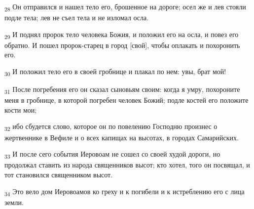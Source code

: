 \begin{tcolorbox}
\textsubscript{28} Он отправился и нашел тело его, брошенное на дороге; осел же и лев стояли подле тела; лев не съел тела и не изломал осла.
\end{tcolorbox}
\begin{tcolorbox}
\textsubscript{29} И поднял пророк тело человека Божия, и положил его на осла, и повез его обратно. И пошел пророк-старец в город [свой], чтобы оплакать и похоронить его.
\end{tcolorbox}
\begin{tcolorbox}
\textsubscript{30} И положил тело его в своей гробнице и плакал по нем: увы, брат мой!
\end{tcolorbox}
\begin{tcolorbox}
\textsubscript{31} После погребения его он сказал сыновьям своим: когда я умру, похороните меня в гробнице, в которой погребен человек Божий; подле костей его положите кости мои;
\end{tcolorbox}
\begin{tcolorbox}
\textsubscript{32} ибо сбудется слово, которое он по повелению Господню произнес о жертвеннике в Вефиле и о всех капищах на высотах, в городах Самарийских.
\end{tcolorbox}
\begin{tcolorbox}
\textsubscript{33} И после сего события Иеровоам не сошел со своей худой дороги, но продолжал ставить из народа священников высот; кто хотел, того он посвящал, и тот становился священником высот.
\end{tcolorbox}
\begin{tcolorbox}
\textsubscript{34} Это вело дом Иеровоамов ко греху и к погибели и к истреблению его с лица земли.
\end{tcolorbox}
